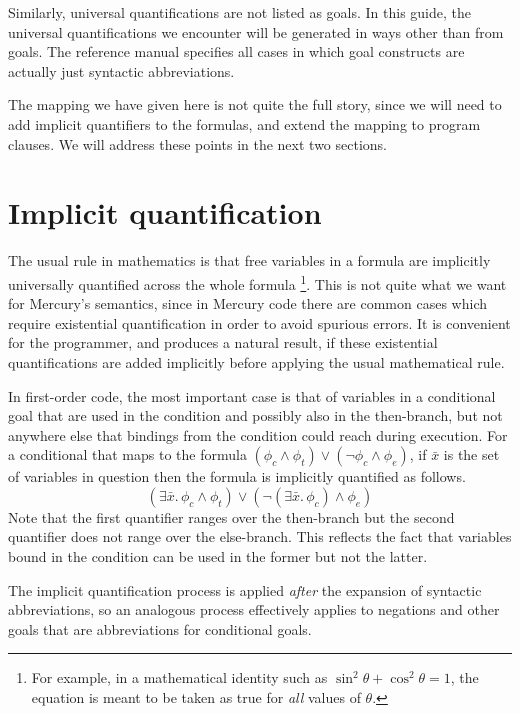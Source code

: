 Similarly,
universal quantifications are not listed as goals.
In this guide,
the universal quantifications we encounter will be
generated in ways other than from goals.
The reference manual specifies all cases
in which goal constructs are actually just syntactic abbreviations.

The mapping we have given here is not quite the full story,
since we will need to add implicit quantifiers to the formulas,
and extend the mapping to program clauses.
We will address these points in the next two sections.


\section{Implicit quantification}
\label{sec:implicit-quantification}

The usual rule in mathematics
is that free variables in a formula
are implicitly universally quantified across the whole formula%
\footnote{
For example,
in a mathematical identity such as
$\sin^2\theta + \cos^2\theta = 1$,
the equation is meant to be taken as true
for \emph{all} values of $\theta$.
}.
This is not quite what we want for Mercury's semantics,
since in Mercury code there are common cases
which require existential quantification
in order to avoid spurious errors.
It is convenient for the programmer,
and produces a natural result,
if these existential quantifications are added implicitly
before applying the usual mathematical rule.

In first-order code,
the most important case is that of variables in a conditional goal
that are used in the condition and possibly also in the then-branch,
but not anywhere else that bindings from the condition
could reach during execution.
For a conditional that maps to the formula
$(\phi_c \land \phi_t) \lor (\lnot \phi_c \land \phi_e)$,
if $\bar{x}$ is the set of variables in question
then the formula is implicitly quantified as follows.
\[
    (\exists \bar{x}.\, \phi_c \land \phi_t) \lor
    (\lnot (\exists \bar{x}.\, \phi_c) \land \phi_e)
\]
Note that the first quantifier ranges over the then-branch
but the second quantifier does not range over the else-branch.
This reflects the fact that variables bound in the condition
can be used in the former but not the latter.

The implicit quantification process is applied
\emph{after} the expansion of syntactic abbreviations,
so an analogous process effectively applies to negations
and other goals that are abbreviations for conditional goals.



